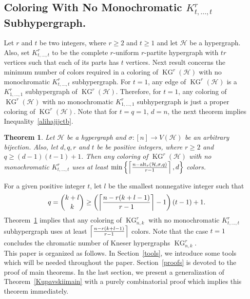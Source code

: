 \documentclass[11pt]{amsart}
\newtheorem{theorem}{Theorem} %
\theoremstyle{definition}
\theoremstyle{remark}
\def\KG{\operatorname{KG}}
\begin{document}
\subsection{\bf Coloring With No Monochromatic $K_{t,\ldots,t}^r$ Subhypergraph.}
Let $r$ and $t$ be two integers, where $r\geq 2$ and $t\geq 1$ and let $\mathcal{H}$ be a hypergraph. Also, set $K_{t,\ldots,t}^r$ to be the complete $r$-uniform $r$-partite hypergraph with $t r$ vertices such that each of its parts has $t$ vertices.
Next result concerns the minimum number of colors required in 
a coloring of $\KG^r(\mathcal{H})$ with no monochromatic $K_{t,\ldots,t}^r$ subhypergraph. For $t=1$,  any edge of $\KG^r(\mathcal{H})$ is a $K_{1,\ldots,1}^r$ subhypergraph of $\KG^r(\mathcal{H})$. Therefore, for $t=1$, any coloring of $\KG^r(\mathcal{H})$ with no monochromatic $K_{1,\ldots,1}^r$ subhypergraph is just a proper coloring of $\KG^r(\mathcal{H})$. 
Note that for $t=q=1$, $d=n$,  the next theorem implies Inequality~\ref{alihajijctb}.
\begin{theorem}\label{genalihaji}
Let $\mathcal{H}$ be a hypergraph and $\sigma:[n]\longrightarrow V(\mathcal{H})$ be an arbitrary bijection. Also, 
let $d,q,r$ and $t$ be be positive integers, where $r\geq 2$ and  $q\geq (d-1)(t-1)+1$. Then
any coloring of $\KG^r(\mathcal{H})$ with no monochromatic $K^r_{t,\ldots,t}$ uses at least 
$\min\left\{\left\lceil{n-{\rm alt}_r(\mathcal{H},\sigma,q)\over r-1}\right\rceil,d\right\}$ colors.
\end{theorem}
For a given positive integer $t$, let $l$ be the smallest nonnegative integer such that 
$$ q={k+l\choose k}\geq \left(\left\lceil{n-r(k+l-1)\over r-1}\right\rceil-1\right)\left(t-1\right)+1.$$
Theorem~\ref{genalihaji} implies that any coloring of $\KG^r_{n,k}$ with no monochromatic 
$K_{t,\ldots,t}^r$ subhypergraph uses at least 
$\left\lceil{n-r(k+l-1)\over r-1}\right\rceil$ colors. Note that the case $t=1$ concludes 
the chromatic number of Kneser hypergraphs $\KG^r_{n,k}$. \\

 This paper is organized as follows. In Section~\ref{tools}, we introduce some tools  
which will be needed throughout the paper. Section~\ref{proofs} is devoted to the 
proof of main theorems. In the last section, we present a generalization of Theorem~\ref{Kupavskiimain} with a purely combinatorial proof which implies this theorem immediately. 
\end{document}
